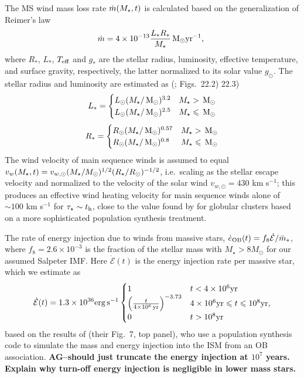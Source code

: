 The MS wind mass loss rate $\dot{m}(M_{\star}, t)$ is calculated based on
the generalization of Reimer's law
\begin{align}
  \dot{m}=4 \times 10^{-13} \frac{L_* R_*}{M_{\star}} \,{\rm M_\odot} {\rm yr}^{-1},\
\end{align}
where  $R_*$, $L_*$, $T_{\rm eff}$ and $g_*$ are the stellar radius,
luminosity, effective temperature, and surface gravity, respectively, the latter normalized to its solar value $g_{\odot}$.  The stellar radius and luminosity are estimated as (\citet{Kippenhahn&Weigert90}; Figs.~22.2) 22.3)
\begin{align}
L_*=
\begin{cases}
L_{\odot} (M_{\star}/\,{\rm M_\odot})^{3.2} & M_{\star} > \,{\rm M_\odot} \\
L_{\odot} (M_{\star}/\,{\rm M_\odot})^{2.5} & M_{\star} \leqslant \,{\rm M_\odot}
\end{cases}
\end{align}
\begin{align}
R_*=
\begin{cases}
R_{\odot} (M_{\star}/\,{\rm M_\odot})^{0.57} & M_{\star} > \,{\rm M_\odot} \\
R_{\odot} (M_{\star}/\,{\rm M_\odot})^{0.8} & M_{\star} \leqslant \,{\rm M_\odot}
\end{cases}
\end{align}
The wind velocity of main sequence winds is assumed to equal $v_w
(M_{\star}, t) =
v_{w,\odot}(M_{\star}/M_{\odot})^{1/2}(R_{\star}/R_{\odot})^{-1/2}$,
i.e.~scaling as the stellar escape velocity and normalized to the
velocity of the solar wind $v_{w,\odot} = 430$ km s$^{-1}$; this
produces an effective wind heating velocity for main sequence winds
alone of $\sim 100$ km s$^{-1}$ for $\tau_{\star} \sim t_{\rm h}$,
close to the value found by \citet{NaimanSoares-Furtado+:2013a} for
globular clusters based on a more sophisticated population synthesis
treatment.

The rate of energy injection due to winds from massive
stars, $\dot{e}_{\rm OB}(t) = f_{8}\dot{\mathcal{E}}/\bar{m}_*$, where
$f_{8} =2.6 \times 10^{-3}$ is the fraction of the stellar mass with
$M_{\star} > 8M_{\odot}$ for our assumed Salpeter IMF.  Here
$\dot{\mathcal{E}} (t)$ is the energy injection rate per massive star,
which we estimate as
\begin{align}
\dot{\mathcal{E}} (t)=  1.3 \times 10^{36} {\rm erg\,s^{-1}}
\begin{cases}
  1 & t<4 \times 10^6 {\rm yr}\\
  \left(\frac{t}{4 \times  10^6\,{\rm yr}}\right)^{-3.73} &  4\times
  10^{6} {\rm yr}  \le t \le 10^{8} {\rm yr},\\
  0 & t > 10^8 {\rm yr}
\end{cases}
\label{eq:voss}
\end{align}
based on the results of \citet{VossDiehl+:2009a} (their Fig.~7, top
panel), who use a population synthesis code to simulate the mass and
energy injection into the ISM from an OB association. {\bf AG--should
  just truncate the energy injection at $10^7$ years. Explain why
  turn-off energy injection is negligible in lower mass stars.}


